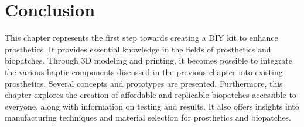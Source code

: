 \section{Conclusion}
This chapter represents the first step towards creating a DIY kit to enhance prosthetics. It provides essential knowledge in the fields of prosthetics and biopatches. Through 3D modeling and printing, it becomes possible to integrate the various haptic components discussed in the previous chapter into existing prosthetics. Several concepts and prototypes are presented. Furthermore, this chapter explores the creation of affordable and replicable biopatches accessible to everyone, along with information on testing and results. It also offers insights into manufacturing techniques and material selection for prosthetics and biopatches. 